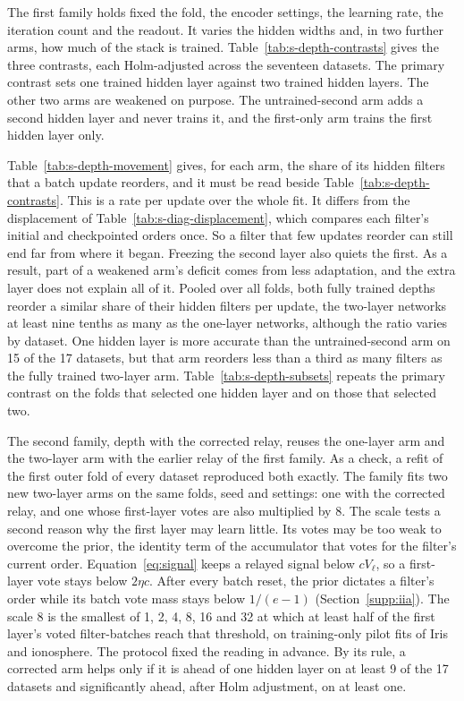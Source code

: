 The first family holds fixed the fold, the encoder settings, the learning rate, the iteration count and the readout. It varies the hidden widths and, in two further arms, how much of the stack is trained. Table~\ref{tab:s-depth-contrasts} gives the three contrasts, each Holm-adjusted across the seventeen datasets. The primary contrast sets one trained hidden layer against two trained hidden layers. The other two arms are weakened on purpose. The untrained-second arm adds a second hidden layer and never trains it, and the first-only arm trains the first hidden layer only.

Table~\ref{tab:s-depth-movement} gives, for each arm, the share of its hidden filters that a batch update reorders, and it must be read beside Table~\ref{tab:s-depth-contrasts}. This is a rate per update over the whole fit. It differs from the displacement of Table~\ref{tab:s-diag-displacement}, which compares each filter's initial and checkpointed orders once. So a filter that few updates reorder can still end far from where it began. Freezing the second layer also quiets the first. As a result, part of a weakened arm's deficit comes from less adaptation, and the extra layer does not explain all of it. Pooled over all folds, both fully trained depths reorder a similar share of their hidden filters per update, the two-layer networks at least nine tenths as many as the one-layer networks, although the ratio varies by dataset. One hidden layer is more accurate than the untrained-second arm on 15 of the 17 datasets, but that arm reorders less than a third as many filters as the fully trained two-layer arm. Table~\ref{tab:s-depth-subsets} repeats the primary contrast on the folds that selected one hidden layer and on those that selected two.

The second family, depth with the corrected relay, reuses the one-layer arm and the two-layer arm with the earlier relay of the first family. As a check, a refit of the first outer fold of every dataset reproduced both exactly. The family fits two new two-layer arms on the same folds, seed and settings: one with the corrected relay, and one whose first-layer votes are also multiplied by 8. The scale tests a second reason why the first layer may learn little. Its votes may be too weak to overcome the prior, the identity term of the accumulator that votes for the filter's current order. Equation~\eqref{eq:signal} keeps a relayed signal below $cV_\ell$, so a first-layer vote stays below $2\eta c$. After every batch reset, the prior dictates a filter's order while its batch vote mass stays below $1/(e-1)$ (Section~\ref{supp:iia}). The scale 8 is the smallest of 1, 2, 4, 8, 16 and 32 at which at least half of the first layer's voted filter-batches reach that threshold, on training-only pilot fits of Iris and ionosphere. The protocol fixed the reading in advance. By its rule, a corrected arm helps only if it is ahead of one hidden layer on at least 9 of the 17 datasets and significantly ahead, after Holm adjustment, on at least one.

